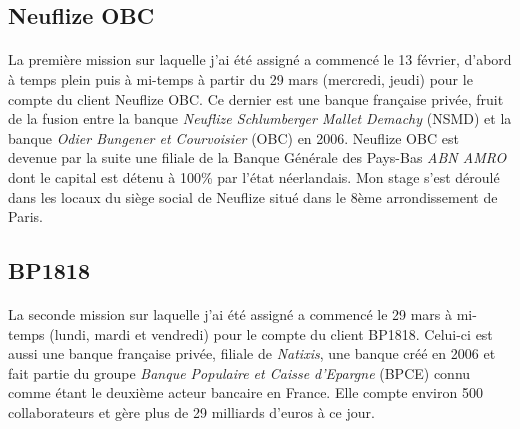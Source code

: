 \subsection{Neuflize OBC}


\paragraph{}
La première mission sur laquelle j'ai été assigné a commencé le 13 février, d'abord à temps plein puis à mi-temps à partir du 29 mars (mercredi, jeudi) pour le compte du client Neuflize OBC. Ce dernier est une banque française privée, fruit de la fusion entre la banque \textit{Neuflize Schlumberger Mallet Demachy} (NSMD) et la banque \textit{Odier Bungener et Courvoisier} (OBC) en 2006. Neuflize OBC est devenue par la suite une filiale de la Banque Générale des Pays-Bas \textit{ABN AMRO} dont le capital est détenu à 100\% par l'état néerlandais. Mon stage s'est déroulé dans les locaux du siège social de Neuflize situé dans le 8ème arrondissement de Paris.

\subsection{BP1818}


\paragraph{}
La seconde mission sur laquelle j'ai été assigné a commencé le 29 mars à mi-temps (lundi, mardi et vendredi) pour le compte du client BP1818. Celui-ci est aussi une banque française privée, filiale de \textit{Natixis}, une banque créé en 2006 et fait partie du groupe \textit{Banque Populaire et Caisse d'Epargne} (BPCE) connu comme étant le deuxième acteur bancaire en France. Elle compte environ 500 collaborateurs et gère plus de 29 milliards d'euros à ce jour.

